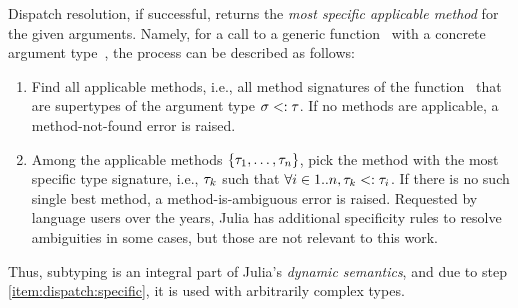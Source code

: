 Dispatch resolution, if successful, returns the \emph{most specific applicable
method} for the given arguments.
Namely, for a call to a generic function~ with a concrete argument
type~\gty, the process can be described as follows:
\begin{enumerate}
  \item Find all applicable methods, i.e., all method signatures \ty of the
    function~ that are supertypes of the argument type $\sigma <: \tau$.
    If no methods are applicable, a method-not-found error is raised.
  \item\label{item:dispatch:specific} Among 
    the applicable methods $\{\tau_1, \ldots, \tau_n\}$,
    pick the method with the most specific type signature,
    i.e., $\tau_k$ such that $\forall i\in1..n, \tau_k <: \tau_i$.
    If there is no such single best method, a method-is-ambiguous
    error is raised. Requested by language users over the years,
    Julia has additional specificity rules to resolve ambiguities in some cases,
    but those are not relevant to this work.
\end{enumerate}
Thus, subtyping is an integral part of Julia's \emph{dynamic semantics},
and due to step \ref{item:dispatch:specific}, it is used with
arbitrarily complex types.




